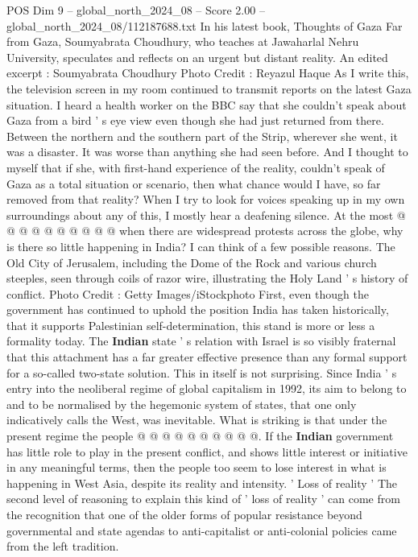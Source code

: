 \begin{textsample}{POS Dim 9 – global\_north\_2024\_08 – Score 2.00 – global\_north\_2024\_08/112187688.txt}  \label{ex:f9_pos_355}
In his latest book, Thoughts of Gaza Far from Gaza, Soumyabrata Choudhury, who teaches at Jawaharlal Nehru University, speculates and reflects on an urgent but distant reality.
An edited excerpt : Soumyabrata Choudhury Photo Credit : Reyazul Haque As I write this, the television screen in my room continued to transmit reports on the latest Gaza situation.
I heard a health worker on the BBC say that she couldn't speak about Gaza from a bird ' s eye view even though she had just returned from there.
Between the northern and the southern part of the Strip, wherever she went, it was a disaster.
It was worse than anything she had seen before.
And I thought to myself that if she, with first-hand experience of the reality, couldn't speak of Gaza as a total situation or scenario, then what chance would I have, so far removed from that reality?
When I try to look for voices speaking up in my own surroundings about any of this, I mostly hear a deafening silence.
At the most @ @ @ @ @ @ @ @ @ @ when there are widespread protests across the globe, why is there so little happening in India?
I can think of a few possible reasons.
The Old City of Jerusalem, including the Dome of the Rock and various church steeples, seen through coils of razor wire, illustrating the Holy Land ' s history of conflict.
Photo Credit : Getty Images/iStockphoto First, even though the government has continued to uphold the position India has taken historically, that it supports Palestinian self-determination, this stand is more or less a formality today.
The \textbf{Indian} state ' s relation with Israel is so visibly fraternal that this attachment has a far greater effective presence than any formal support for a so-called two-state solution.
This in itself is not surprising.
Since India ' s entry into the neoliberal regime of global capitalism in 1992, its aim to belong to and to be normalised by the hegemonic system of states, that one only indicatively calls the West, was inevitable.
What is striking is that under the present regime the people @ @ @ @ @ @ @ @ @ @.
If the \textbf{Indian} government has little role to play in the present conflict, and shows little interest or initiative in any meaningful terms, then the people too seem to lose interest in what is happening in West Asia, despite its reality and intensity. ' Loss of reality ' The second level of reasoning to explain this kind of ' loss of reality ' can come from the recognition that one of the older forms of popular resistance beyond governmental and state agendas to anti-capitalist or anti-colonial policies came from the left tradition.

\end{textsample}

